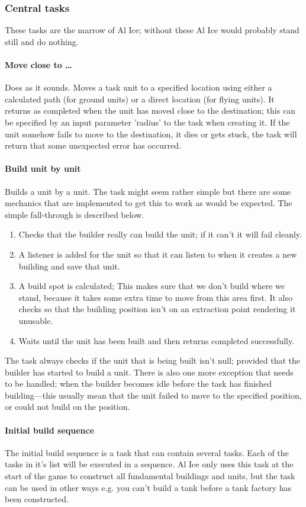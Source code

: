 \subsubsection{Central tasks}
These tasks are the marrow of Al Ice; without these Al Ice would probably stand still and do
nothing.
\paragraph{Move close to \ldots}
Does as it sounds. Moves a task unit to a specified location using either a calculated path (for
ground units) or a direct location (for flying units). It returns as completed when the unit has
moved close to the destination; this can be specified by an input parameter 'radius' to the task
when creating it. If the unit somehow fails to move to the destination, it dies or gets stuck, the
task will return that some unexpected error has occurred.

\paragraph{Build unit by unit}
Builds a unit by a unit. The task might seem rather simple but there are some mechanics that are
implemented to get this to work as would be expected. The simple fall-through is described below.
\begin{enumerate}
\item Checks that the builder really can build the unit; if it can't it will fail
cleanly.
\item A listener is added for the unit so that it can listen to when it creates a new building
and save that unit.
\item A build spot is calculated; This makes sure that we don't build where we stand, because it
takes some extra time to move from this area first. It also checks so that the building position
isn't on an extraction point rendering it unusable.
\item Waits until the unit has been built and then returns completed successfully.
\end{enumerate}
The task always checks if the unit that is being built isn't null; provided that the builder has
started to build a unit. There is also one more exception that needs to be handled; when the builder
becomes idle before the task has finished building---this usually mean that the unit failed to move
to the specified position, or could not build on the position.

\paragraph{Initial build sequence}
The initial build sequence is a task
that can contain several tasks. Each of the tasks in it's list will be executed
in a sequence. Al Ice only uses this task at the start of the game to construct
all fundamental buildings and units, but the task can be used in other ways e.g.
you can't build a tank before a tank factory has been constructed. 

